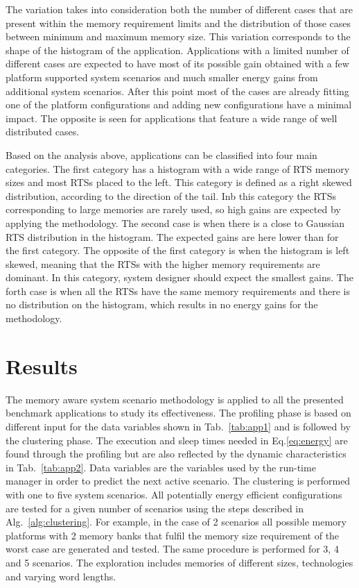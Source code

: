 \documentclass[smallcondensed]{svjour3}
\begin{document}
The variation takes into consideration both the number of different cases that are present within the memory requirement limits and the distribution of those cases between minimum and maximum memory size. 
This variation corresponds to the shape of the histogram of the application.
Applications with a limited number of different cases are expected to have most of its possible gain obtained with a few platform supported system scenarios and much smaller energy gains from additional system scenarios. 
After this point most of the cases are already fitting one of the platform configurations and adding new configurations have a minimal impact. 
The opposite is seen for applications that feature a wide range of well distributed cases.

Based on the analysis above, applications can be classified into four main categories. 
The first category has a histogram with a wide range of RTS memory sizes and most RTSs placed to the left. This category is defined as a right skewed distribution, according to the direction of the tail.
Inb this category the RTSs corresponding to large memories are rarely used, so high gains are expected by applying the methodology.
The second case is when there is a close to Gaussian RTS distribution in the histogram. The expected gains are here lower than for the first category.
The opposite of the first category is when the histogram is left skewed, meaning that the RTSs with the higher memory requirements are dominant.
In this category, system designer should expect the smallest gains.
The forth case is when all the RTSs have the same memory requirements and there is no distribution on the histogram, which results in no energy gains for the methodology.

\section{Results}
\label{sec:results}

The memory aware system scenario methodology is applied to all the presented benchmark applications to study its effectiveness. 
The profiling phase is based on different input for the data variables shown in Tab.~\ref{tab:app1} and is followed by the clustering phase. 
The execution and sleep times needed in Eq.\ref{eq:energy} are found through the profiling but are also reflected by the dynamic characteristics in Tab.~\ref{tab:app2}. 
Data variables are the variables used by the run-time manager in order to predict the next active scenario. 
The clustering is performed with one to five system scenarios. 
All potentially energy efficient configurations are tested for a given number of scenarios using the steps described in Alg.~\ref{alg:clustering}. 
For example, in the case of 2 scenarios all possible memory platforms with 2 memory banks that fulfil the memory size requirement of the worst case are generated and tested. 
The same procedure is performed for 3, 4 and 5 scenarios. 
The exploration includes memories of different sizes, technologies and varying word lengths. 
\end{document}
